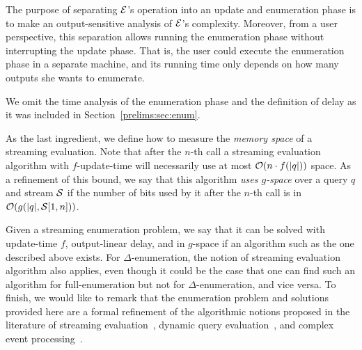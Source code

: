 The purpose of separating $\mathcal{E}$’s operation into an update and enumeration phase is to make an output-sensitive analysis of $\mathcal{E}$’s complexity. Moreover, from a user perspective, this separation allows running the enumeration phase without interrupting the update phase. That is, the user could execute the enumeration phase in a separate machine, and its running time only depends on how many outputs she wants to enumerate.  

We omit the time analysis of the enumeration phase and the definition of delay as it was included in Section~\ref{prelims:sec:enum}.

As the last ingredient, we define how to measure the \emph{memory space} of a streaming evaluation. Note that after the $n$-th call a streaming evaluation algorithm with $f$-update-time will necessarily use at most $\mathcal{O}(n\cdot f(|q|))$ space. As a refinement of this bound, we say that this algorithm \emph{uses $g$-space} over a query $q$ and stream $\mathcal{S}$ if the number of bits used by it after the $n$-th call is in $\mathcal{O}(g(|q|, \mathcal{S}[1, n]))$.

Given a streaming enumeration problem, we say that it can be solved with update-time $f$, output-linear delay, and in $g$-space if an algorithm such as the one described above exists. For $\Delta$-enumeration, the notion of streaming evaluation algorithm also applies, even though it could be the case that one can find such an algorithm for full-enumeration but not for $\Delta$-enumeration, and vice versa. 
To finish, we would like to remark that the enumeration problem and solutions provided here are a formal refinement of the algorithmic notions proposed in the literature of streaming evaluation~\cite{GauwinNT09}, dynamic query evaluation~\cite{BerkholzKS17,IdrisUV17}, and complex event processing~\cite{GrezRU19,GrezR20}.
